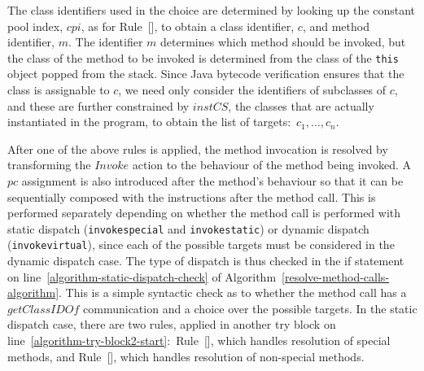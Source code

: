 The class identifiers used in the choice are determined by looking up
the constant pool index, $cpi$, as for
Rule~[], to obtain a class
identifier, $c$, and method identifier, $m$.
The identifier $m$ determines which method should be invoked, but the
class of the method to be invoked is determined from the class of the
\texttt{this} object popped from the stack.
Since Java bytecode verification ensures that the class is assignable
to $c$, we need only consider the identifiers of subclasses of $c$,
and these are further constrained by $instCS$, the classes that are
actually instantiated in the program, to obtain the list of
targets:~$c_1, \ldots , c_n$.

After one of the above rules is applied, the method invocation is
resolved by transforming the $Invoke$ action to the behaviour of the
method being invoked.
A $pc$ assignment is also introduced after the
method's behaviour so that it can be sequentially composed with the
instructions after the method call.
This is performed separately depending on whether the method call is
performed with static dispatch (\texttt{invokespecial} and
\texttt{invokestatic}) or dynamic dispatch (\texttt{invokevirtual}),
since each of the possible targets must be considered in the dynamic
dispatch case.
The type of dispatch is thus checked in the if statement on
line~\ref{algorithm-static-dispatch-check} of
Algorithm~\ref{resolve-method-calls-algorithm}.
This is a simple syntactic check as to whether the method call has a
$getClassIDOf$ communication and a choice over the possible targets.
In the static dispatch case, there are two rules, applied in another
try block on
line~\ref{algorithm-try-block2-start}:~Rule~[],
which handles resolution of special methods, and
Rule~[], which handles resolution
of non-special methods.

